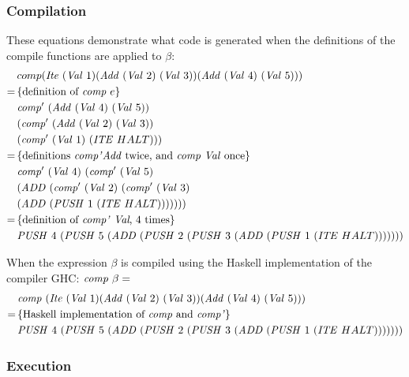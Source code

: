 \documentclass {article}
\begin{document}
\subsubsection{Compilation}

These equations demonstrate what code is generated
when the definitions of the compile functions are applied to $\beta$:
\begin{align*}
	&comp (\Ite	(\Val 1) (\Add (\Val 2)\ (\Val 3)) (\Add (\Val 4)\ (\Val 5))) \\
	=\, & \{ \mbox{definition of \comp\ $e$} \}\ \\ 
	&\Compp  (\Add (\Val 4)\ (\Val 5))\\
		&(\Compp  (\Add (\Val 2)\ (\Val 3))\\
			&(\Compp  (\Val 1)\ (\ITE  HALT))) \\
	=\, & \{ \mbox{definitions \compp \add\ twice, 
					and \comp\ \val\ once} \} \\
	&\Compp  (\Val 4)\ 
		(\Compp  (\Val 5)\ \\
				&(\ADD  (\Compp  (\Val 2)\ 
						(\Compp  (\Val 3)\ \\
							&(\ADD  (\PUSH 1\ 
								(\ITE HALT))))))) \\
	=\, & \{ \mbox{definition of \compp\ \val, 4 times} \} \\
	&\PUSH 4\ (\PUSH 5\ 
		(\ADD  (\PUSH 2\ (\PUSH 3\ 
			(\ADD  (\PUSH 1\ (\ITE HALT)))))))
\end{align*}

When the expression $\beta$ is compiled
using the Haskell implementation of the compiler
GHC: \( \mathit{comp\ } \beta =\)
\begin{align*}
&\Comp (\Ite
			(\Val 1)
			(\Add (\Val 2)\ (\Val 3))
			(\Add (\Val 4)\ (\Val 5))) \\
=\, & \{ \mbox{Haskell implementation of \comp\ and \compp} \} \\
&\PUSH 4\ (\PUSH 5\
	(\ADD  (\PUSH 2\ (\PUSH 3\ 
		(\ADD  (\PUSH 1\ (\ITE HALT)))))))
\end{align*}
	
\subsubsection{Execution}
\end{document}
